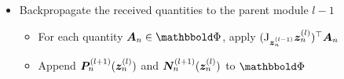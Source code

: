 \begin{itemize}
\item Backpropagate the received quantities to the parent module $l-1$
  \begin{itemize}
  \item For each quantity $\mA_n \in \sPhi$, apply
    $(\mathrm{J}_{{\bm{z}}_n^{(l-1)}}{\bm{z}}_n^{(l)})^\top {\bm{A}}_n$
  \item Append ${\bm{P}}_n^{(l+1)}({\bm{z}}_n^{(l)})$ and ${\bm{N}}_n^{(l+1)}({\bm{z}}_n^{(l)})$ to
    $\sPhi$
  \end{itemize}
\end{itemize}

